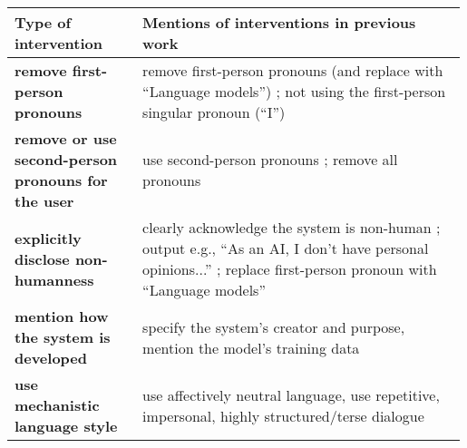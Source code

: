 \documentclass[11pt]{article}
\newcounter{intervention}  %
\begin{document}
\begin{table*}[th]\tiny
\def\arraystretch{0.95}
\setlength{\tabcolsep}{0.4em}
\begin{tabular}{
@{}p{0.28\linewidth}
|p{0.71\linewidth}@{}
}
\textbf{Type of intervention} 
& \textbf{Mentions of interventions in previous work}  
\\\hline

\textbf{remove first-person pronouns}                           
& remove first-person pronouns (and replace with ``Language models'') \cite{abercrombie-etal-2023-mirages,cohn2024believing}; not using the first-person singular pronoun (“I”) \cite{shneidermandumpty}                                                          
\\\hline

\textbf{remove or use second-person pronouns for the user
}                          
& use second-person pronouns \cite{cohn2024believing}; remove all pronouns \cite{shneidermandumpty}  
\\\hline

\textbf{explicitly disclose non-humanness}                      
& clearly acknowledge the system is non-human \cite{gros-etal-2021-r};    output e.g., ``As an  AI, I don’t have personal opinions...'' \cite{Glaese2022-qo}; replace first-person pronoun with ``Language models'' \cite[Fig.~1 in ][]{abercrombie-etal-2023-mirages} 
\\\hline

\textbf{mention how the system is developed}                 
& specify the system's creator and purpose, mention the model's training data \cite[Fig. 1 in ][]{abercrombie-etal-2023-mirages}                                
\\\hline

\textbf{use mechanistic language style}                                      
& use affectively neutral language, use repetitive, impersonal, highly structured/terse dialogue \cite{quintanar1982interactive}                                                       
\\\hline


\end{tabular}
\end{table*}
\end{document}
